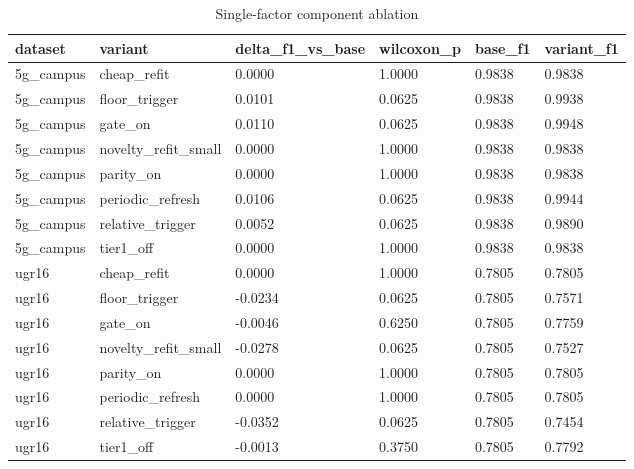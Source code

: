 \begin{table}[t]
\centering
\caption{Single-factor component ablation}
\label{tab:t7}
\begin{tabular}{llllll}
\toprule
dataset & variant & delta\_f1\_vs\_base & wilcoxon\_p & base\_f1 & variant\_f1 \\
\midrule
5g\_campus & cheap\_refit & 0.0000 & 1.0000 & 0.9838 & 0.9838 \\
5g\_campus & floor\_trigger & 0.0101 & 0.0625 & 0.9838 & 0.9938 \\
5g\_campus & gate\_on & 0.0110 & 0.0625 & 0.9838 & 0.9948 \\
5g\_campus & novelty\_refit\_small & 0.0000 & 1.0000 & 0.9838 & 0.9838 \\
5g\_campus & parity\_on & 0.0000 & 1.0000 & 0.9838 & 0.9838 \\
5g\_campus & periodic\_refresh & 0.0106 & 0.0625 & 0.9838 & 0.9944 \\
5g\_campus & relative\_trigger & 0.0052 & 0.0625 & 0.9838 & 0.9890 \\
5g\_campus & tier1\_off & 0.0000 & 1.0000 & 0.9838 & 0.9838 \\
ugr16 & cheap\_refit & 0.0000 & 1.0000 & 0.7805 & 0.7805 \\
ugr16 & floor\_trigger & -0.0234 & 0.0625 & 0.7805 & 0.7571 \\
ugr16 & gate\_on & -0.0046 & 0.6250 & 0.7805 & 0.7759 \\
ugr16 & novelty\_refit\_small & -0.0278 & 0.0625 & 0.7805 & 0.7527 \\
ugr16 & parity\_on & 0.0000 & 1.0000 & 0.7805 & 0.7805 \\
ugr16 & periodic\_refresh & 0.0000 & 1.0000 & 0.7805 & 0.7805 \\
ugr16 & relative\_trigger & -0.0352 & 0.0625 & 0.7805 & 0.7454 \\
ugr16 & tier1\_off & -0.0013 & 0.3750 & 0.7805 & 0.7792 \\
\bottomrule
\end{tabular}
\end{table}
